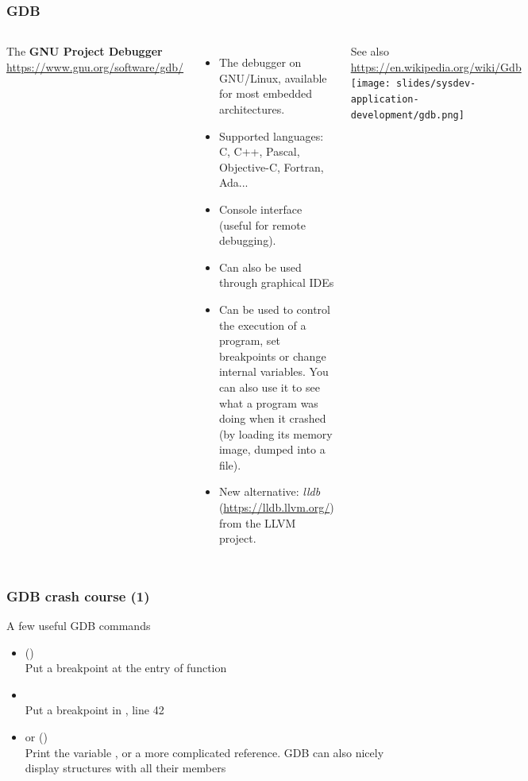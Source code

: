 \begin{frame}
  \frametitle{GDB}
  \fontsize{11}{11}\selectfont
  \begin{columns}[T]
    The {\bf GNU Project Debugger}\\
    \url{https://www.gnu.org/software/gdb/}
    \begin{itemize}
    \item The debugger on GNU/Linux, available for most embedded
      architectures.
    \item Supported languages: C, C++, Pascal, Objective-C, Fortran,
      Ada...
    \item Console interface (useful for remote debugging).
    \item Can also be used through graphical IDEs
    \item Can be used to control the execution of a program, set
      breakpoints or change internal variables. You can also use it to
      see what a program was doing when it crashed (by loading its
      memory image, dumped into a  file).
    \item New alternative: {\em lldb} (\url{https://lldb.llvm.org/})\\
      from the LLVM project.
    \end{itemize}
    See also \url{https://en.wikipedia.org/wiki/Gdb}
    \texttt{[image: slides/sysdev-application-development/gdb.png]}
  \end{columns}
\end{frame}

\begin{frame}
  \frametitle{GDB crash course (1)}
  \small
  A few useful GDB commands
  \begin{itemize}
  \item {} ()\\
    Put a breakpoint at the entry of function 
  \item {}\\
    Put a breakpoint in , line 42
  \item {} or  ()\\
    Print the variable , or a more complicated reference. GDB
    can also nicely display structures with all their members
  \end{itemize}
\end{frame}

